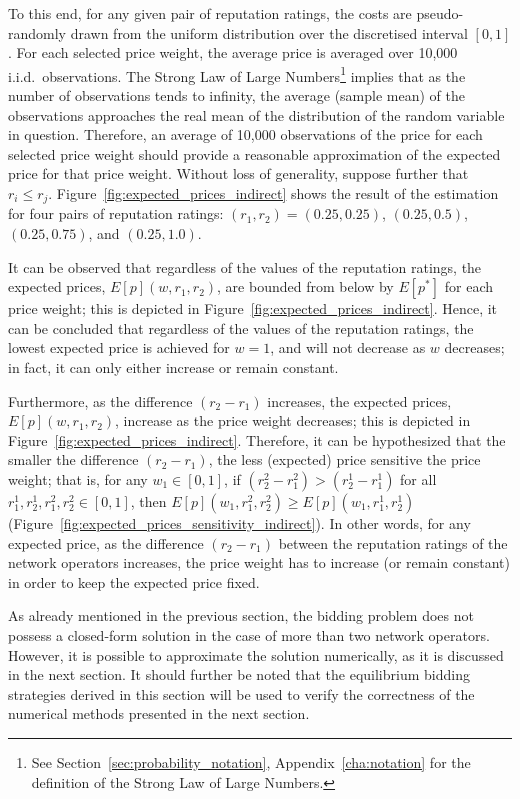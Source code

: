 To this end, for any given pair of reputation ratings, the costs are pseudo-randomly drawn from the uniform distribution over the discretised interval $[0,1]$. For each selected price weight, the average price is averaged over 10,000 i.i.d.~observations. The Strong Law of Large Numbers\footnote{See Section~\ref{sec:probability_notation}, Appendix~\ref{cha:notation} for the definition of the Strong Law of Large Numbers.} implies that as the number of observations tends to infinity, the average (sample mean) of the observations approaches the real mean of the distribution of the random variable in question. Therefore, an average of 10,000 observations of the price for each selected price weight should provide a reasonable approximation of the expected price for that price weight. Without loss of generality, suppose further that $r_i \le r_j$. Figure~\ref{fig:expected_prices_indirect} shows the result of the estimation for four pairs of reputation ratings: $(r_1, r_2) = (0.25, 0.25)$, $(0.25, 0.5)$, $(0.25, 0.75)$, and $(0.25, 1.0)$.

It can be observed that regardless of the values of the reputation ratings, the expected prices, $E[p](w,r_1,r_2)$, are bounded from below by $E[p^*]$ for each price weight; this is depicted in Figure~\ref{fig:expected_prices_indirect}. Hence, it can be concluded that regardless of the values of the reputation ratings, the lowest expected price is achieved for $w=1$, and will not decrease as $w$ decreases; in fact, it can only either increase or remain constant.

Furthermore, as the difference $(r_2-r_1)$ increases, the expected prices, $E[p](w,r_1,r_2)$, increase as the price weight decreases; this is depicted in Figure~\ref{fig:expected_prices_indirect}. Therefore, it can be hypothesized that the smaller the difference $(r_2-r_1)$, the less (expected) price sensitive the price weight; that is, for any $w_1\in[0,1]$, if $(r^2_2-r^2_1) > (r^1_2-r^1_1)$ for all $r^1_1,r^1_2,r^2_1,r^2_2\in [0,1]$, then $E[p](w_1,r^2_1,r^2_2) \ge E[p](w_1,r^1_1,r^1_2)$ (Figure~\ref{fig:expected_prices_sensitivity_indirect}). In other words, for any expected price, as the difference $(r_2-r_1)$ between the reputation ratings of the network operators increases, the price weight has to increase (or remain constant) in order to keep the expected price fixed.

As already mentioned in the previous section, the bidding problem does not possess a closed-form solution in the case of more than two network operators. However, it is possible to approximate the solution numerically, as it is discussed in the next section. It should further be noted that the equilibrium bidding strategies derived in this section will be used to verify the correctness of the numerical methods presented in the next section.

